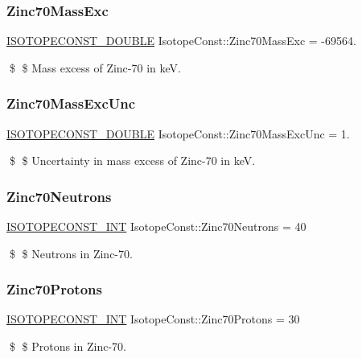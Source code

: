 \subsubsection{\texorpdfstring{Zinc70\+Mass\+Exc}{Zinc70MassExc}}
{\footnotesize\ttfamily \mbox{\hyperlink{group___isotope_const-_macros_ga8f45a7272ce02c0b4c65c44636ed719a}{I\+S\+O\+T\+O\+P\+E\+C\+O\+N\+S\+T\+\_\+\+D\+O\+U\+B\+LE}} Isotope\+Const\+::\+Zinc70\+Mass\+Exc = -\/69564.}

\$ \$ Mass excess of Zinc-\/70 in keV. \mbox{\label{group___isotope_const-_zinc-_zn70_ga435a55b968921c1d833e82fde6683469}} 
\subsubsection{\texorpdfstring{Zinc70\+Mass\+Exc\+Unc}{Zinc70MassExcUnc}}
{\footnotesize\ttfamily \mbox{\hyperlink{group___isotope_const-_macros_ga8f45a7272ce02c0b4c65c44636ed719a}{I\+S\+O\+T\+O\+P\+E\+C\+O\+N\+S\+T\+\_\+\+D\+O\+U\+B\+LE}} Isotope\+Const\+::\+Zinc70\+Mass\+Exc\+Unc = 1.}

\$ \$ Uncertainty in mass excess of Zinc-\/70 in keV. \mbox{\label{group___isotope_const-_zinc-_zn70_ga79c81b9f2a0302139e77e76c9b5a85a7}} 
\subsubsection{\texorpdfstring{Zinc70\+Neutrons}{Zinc70Neutrons}}
{\footnotesize\ttfamily \mbox{\hyperlink{group___isotope_const-_macros_ga5f18360b3e99483a35c32d789e62621c}{I\+S\+O\+T\+O\+P\+E\+C\+O\+N\+S\+T\+\_\+\+I\+NT}} Isotope\+Const\+::\+Zinc70\+Neutrons = 40}

\$ \$ Neutrons in Zinc-\/70. \mbox{\label{group___isotope_const-_zinc-_zn70_ga9137ec56da014ace4c752373c47e6c71}} 
\subsubsection{\texorpdfstring{Zinc70\+Protons}{Zinc70Protons}}
{\footnotesize\ttfamily \mbox{\hyperlink{group___isotope_const-_macros_ga5f18360b3e99483a35c32d789e62621c}{I\+S\+O\+T\+O\+P\+E\+C\+O\+N\+S\+T\+\_\+\+I\+NT}} Isotope\+Const\+::\+Zinc70\+Protons = 30}

\$ \$ Protons in Zinc-\/70. 